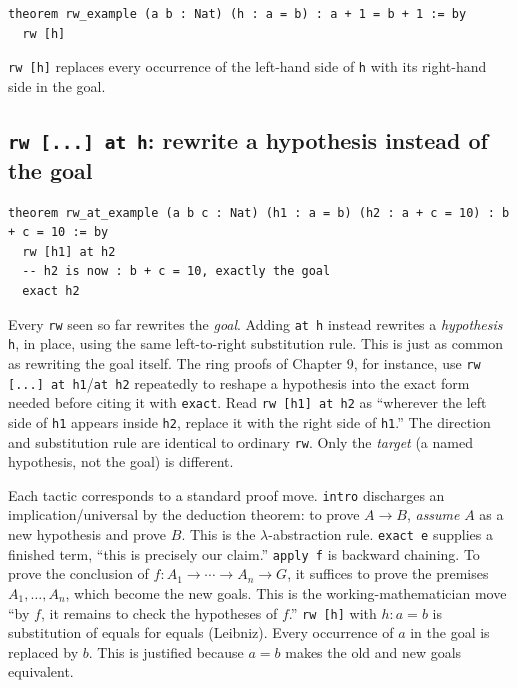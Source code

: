 \begin{lstlisting}
theorem rw_example (a b : Nat) (h : a = b) : a + 1 = b + 1 := by
  rw [h]
\end{lstlisting}

\texttt{rw [h]} replaces every occurrence of the left-hand side of \texttt{h} with its right-hand side in the goal.

\subsection{\texorpdfstring{\texttt{rw\ {[}...{]}\ at\ h}: rewrite a hypothesis instead of the goal}{rw {[}...{]} at h: rewrite a hypothesis instead of the goal}}\label{sec:04-tactics:02-core-tactics:6}

\begin{lstlisting}
theorem rw_at_example (a b c : Nat) (h1 : a = b) (h2 : a + c = 10) : b + c = 10 := by
  rw [h1] at h2
  -- h2 is now : b + c = 10, exactly the goal
  exact h2
\end{lstlisting}

Every \texttt{rw} seen so far rewrites the \emph{goal}. Adding \texttt{at h} instead rewrites a \emph{hypothesis} \texttt{h}, in place, using the same left-to-right substitution rule. This is just as common as rewriting the goal itself. The ring proofs of Chapter 9, for instance, use \texttt{rw [...] at h1}/\texttt{at h2} repeatedly to reshape a hypothesis into the exact form needed before citing it with \texttt{exact}. Read \texttt{rw [h1] at h2} as ``wherever the left side of \texttt{h1} appears inside \texttt{h2}, replace it with the right side of \texttt{h1}.'' The direction and substitution rule are identical to ordinary \texttt{rw}. Only the \emph{target} (a named hypothesis, not the goal) is different.

\begin{mathreading}

Each tactic corresponds to a standard proof move. \texttt{intro} discharges an implication/universal by the deduction theorem: to prove \(A \to B\), \emph{assume} \(A\) as a new hypothesis and prove \(B\). This is the \(\lambda\)-abstraction rule. \texttt{exact e} supplies a finished term, ``this is precisely our claim.'' \texttt{apply f} is backward chaining. To prove the conclusion of \(f : A_1 \to \cdots \to A_n \to G\), it suffices to prove the premises \(A_1, \ldots, A_n\), which become the new goals. This is the working-mathematician move ``by \(f\), it remains to check the hypotheses of \(f\).'' \texttt{rw [h]} with \(h : a = b\) is substitution of equals for equals (Leibniz). Every occurrence of \(a\) in the goal is replaced by \(b\). This is justified because \(a = b\) makes the old and new goals equivalent.

\end{mathreading}

